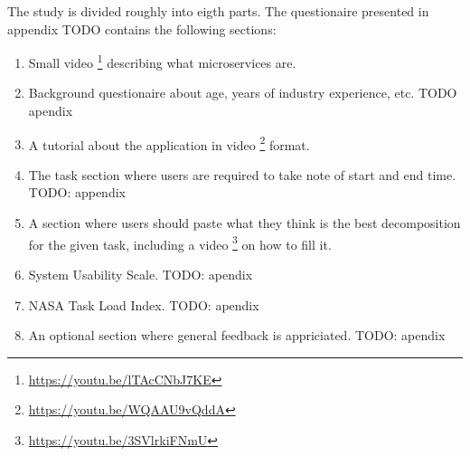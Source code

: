 The study is divided roughly into eigth parts. The questionaire presented in appendix TODO contains the following sections:

\begin{enumerate}[1.]
  \item Small video \footnote{\url{https://youtu.be/lTAcCNbJ7KE}} describing what microservices are.
  \item Background questionaire about age, years of industry experience, etc. TODO apendix
  \item A tutorial about the application in video \footnote{\url{https://youtu.be/WQAAU9vQddA}} format.
  \item The task section where users are required to take note of start and end time. TODO: appendix
  \item A section where users should paste what they think is the best decomposition for the given task, including a video \footnote{\url{https://youtu.be/3SVlrkiFNmU}} on how to fill it.
  \item System Usability Scale. TODO: apendix
  \item NASA Task Load Index. TODO: apendix
  \item An optional section where general feedback is appriciated. TODO: apendix
\end{enumerate}
